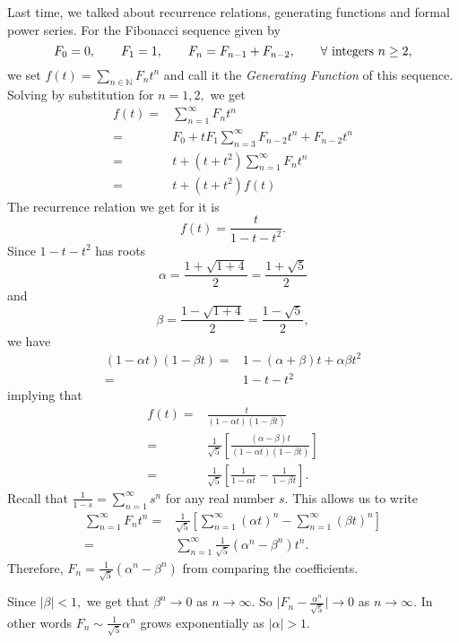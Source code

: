

Last time, we talked about recurrence relations, generating functions and formal power series.
For the Fibonacci sequence given by
$$ F_0 = 0, \qquad F_1 = 1, \qquad F_n = F_{n-1} + F_{n-2}, \qquad \forall \/ \text{ integers } 
n \geq 2,$$
we set $f(t) = \sum_{n \in \mathbb{N}}^{} F_n t^n$ and call it the \emph{Generating Function}
of this sequence.
Solving by substitution for $n=1,2,$ we get
\begin{align*}
	f(t) ={}& \sum_{n=1}^{\infty} F_n t^n \\
	={}& F_0 + t F_1 \sum_{n=3}^{\infty} F_{n-2} t^n + F_{n-2} t^n \\
	={}& t + (t + t^2) \sum_{n=1}^{\infty} F_{n} t^n \\
	={}& t + (t + t^2) f(t)
\end{align*}
The recurrence relation we get for it is
$$ f(t) =  \frac{t}{1 - t - t^2}.$$
Since $ 1 - t - t^2$ has roots 
$$\alpha = \frac{1 + \sqrt{1 + 4}}{2} = \frac{1 + \sqrt{5}}{2}$$ and 
$$\beta = \frac{1 - \sqrt{1 +4 }}{2} = \frac{1 - \sqrt{5}}{2},$$ 
we have
\begin{align*}
	( 1 - \alpha t)(1 - \beta t) ={}& 1 - (\alpha + \beta) t + \alpha \beta t^2\\
	={}& 1 - t - t^2 
\end{align*}
implying that
\begin{align*}
	f(t) ={}& \frac{t}{(1 - \alpha t ) ( 1 - \beta t)} \\
	={}& \frac{1}{\sqrt{5}} \left[  \frac{( \alpha - \beta ) t}{
	(1 - \alpha t)(1 - \beta t) }\right] \\
	={}& \frac{1}{ \sqrt{5}} \left[ \frac{1}{1 - \alpha t} - \frac{1}{ 1 - \beta t} \right].
\end{align*}
Recall that $ \frac{1}{1-s} = \sum_{n=1}^{\infty} s ^n$ for any real number $s.$
This allows us to write
\begin{align*}
	\sum_{n=1}^{\infty} F_n t^n ={}& \frac{1}{\sqrt{5}} \left[ \sum_{n=1}^{\infty} 
	(\alpha t)^n - \sum_{n=1}^{\infty} ( \beta t)^n \right] \\
	={}& \sum_{n=1}^{\infty} \frac{1}{\sqrt{5}} \left( \alpha^n - \beta^n \right) t^n.
\end{align*}
Therefore, $F_n = \frac{1}{\sqrt{5}} \left( \alpha^n  -\beta^n \right)$
from comparing the coefficients.

Since $ \lvert  \beta \rvert < 1,$ we get that $ \beta^n \to 0$ as $ n \to \infty.$
So $ \lvert  F_n - \frac{\alpha^n}{\sqrt{5}} \rvert \to 0$ as $n \to \infty.$
In other words $F_n \sim \frac{1}{\sqrt{5}} \alpha^n$ grows exponentially as $ \lvert 
\alpha\rvert >1.$

